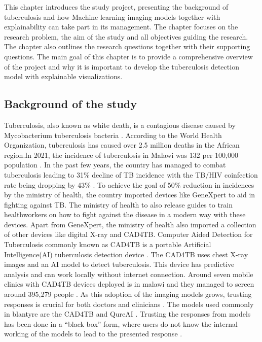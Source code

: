 \documentclass[12pt,a4paper]{article}
\begin{document}
This chapter introduces the study project, presenting the background of tuberculosis
and how Machine learning imaging models together with explainability can take part in its management. The chapter focuses on the research problem, the aim of the
study and all objectives guiding the research.
The chapter also outlines the research questions together with their supporting questions. The main goal of this chapter is to provide a comprehensive overview of 
the project and why it is important to develop the tuberculosis detection model with explainable visualizations.

\subsection{Background of the study}
Tuberculosis, also known as white death, is a contagious disease caused by Mycobacterium tuberculosis bacteria \citep{Hawn2014}. According to the World Health Organization, tuberculosis has caused over 2.5 million deaths in the African region.In 2021, the incidence of tuberculosis in Malawi was 132 per 100,000 population \citep{WHO2023}. In the past few years, the country has managed to combat tuberculosis leading to 31\% decline of TB incidence with the TB/HIV coinfection rate being dropping by 43\% \citep{KUHES2024}. To achieve the goal of 50\% reduction in incidences by the ministry of health, the country imported devices like GeneXpert to aid in fighting against TB. The ministry of health to also release guides to train healthworkers on how to fight against the disease in a modern way with these devices.
 Apart from GeneXpert, the ministry of health also imported a collection of other devices like digital X-ray and CAD4TB. Computer Aided Detection for Tuberculosis commonly known as CAD4TB is a portable Artificial Intelligence(AI) tuberculosis detection device \citep{KUHES2024}. The CAD4TB uses chest X-ray images and an AI model to detect tuberculosis. This device has predictive analysis and can work locally without internet connection. Around seven mobile clinics with CAD4TB devices deployed is in malawi and they managed to screen around 395,279 people \citep{Delft-Imaging2023}.
 As this adoption of the imaging models grows, trusting responses is crucial for both doctors and clinicians \citep{Fehr2021}. The models used commonly in blantyre are the CAD4TB and QureAI \citep{Twabi2021}. Trusting the responses from models has been done in a ``black box'' form, where users do not know the internal working of the models to lead to the presented response \citep{Ribeiro2016}. 
\end{document}
